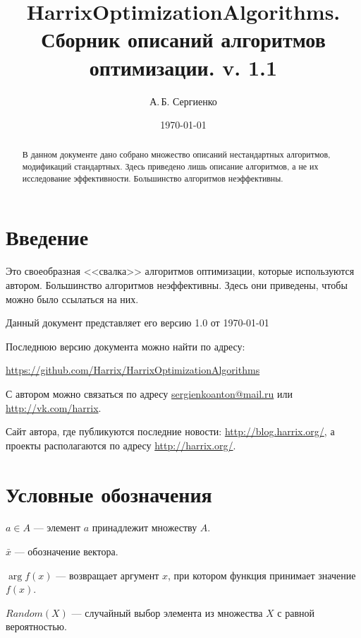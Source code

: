 \documentclass[a4paper,12pt]{article}
\title{HarrixOptimizationAlgorithms. Сборник описаний алгоритмов оптимизации. v. 1.1}
\author{А.\,Б. Сергиенко}
\date{\today}
\begin{document}


\maketitle

\begin{abstract}
В данном документе дано собрано множество описаний нестандартных алгоритмов, модификаций стандартных. Здесь приведено лишь описание алгоритмов, а не их исследование эффективности. Большинство алгоритмов неэффективны.
\end{abstract}

\tableofcontents

\newpage

\section{Введение}

Это своеобразная <<свалка>> алгоритмов оптимизации, которые используются автором. Большинство алгоритмов неэффективны. Здесь они приведены, чтобы можно было ссылаться на них.

Данный документ представляет его версию 1.0 от \today

Последнюю версию документа можно найти по адресу:

\href{https://github.com/Harrix/HarrixOptimizationAlgorithms}{https://github.com/Harrix/HarrixOptimizationAlgorithms}

С автором можно связаться по адресу \href{mailto:sergienkoanton@mail.ru}{sergienkoanton@mail.ru} или  \href{http://vk.com/harrix}{http://vk.com/harrix}.

Сайт автора, где публикуются последние новости: \href{http://blog.harrix.org/}{http://blog.harrix.org/}, а проекты располагаются по адресу \href{http://harrix.org/}{http://harrix.org/}.

\section{Условные обозначения}\label{SetOfOperatorsAlgorithms:section_symbols}

$a \in A$ --- элемент $ a $ принадлежит множеству $ A $.

$ \bar{x} $ --- обозначение вектора.

$ \arg{f(x)} $ --- возвращает аргумент $x$, при котором функция принимает значение $ f(x) $.

$ Random(X) $ --- случайный выбор элемента из множества $ X $ с равной вероятностью.
\end{document}
